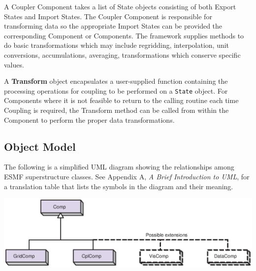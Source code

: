 A Coupler Component takes a list of State objects consisting of
both Export States and Import States.
The Coupler Component is responsible for transforming data 
so the appropriate Import States can be provided the corresponding
Component or Components.
The framework supplies
methods to do basic transformations which may include regridding,
interpolation, unit conversions, accumulations, averaging,
transformations which conserve specific values.


A {\bf Transform} object encapsulates a user-supplied function
containing the processing operations for coupling to be 
performed on a {\tt State} object.  For Components where it is not
feasible to return to the calling routine each time Coupling is
required, the Transform method can be called from within the
Component to perform the proper data transformations.

\newpage
\subsection{Object Model}

The following is a simplified UML diagram showing the relationships among
ESMF superstructure classes.  See Appendix A, {\it A Brief 
Introduction to UML},
for a translation table that lists the symbols in the diagram and their 
meaning.

\begin{center}
\includegraphics{Comp_obj.eps}   
\end{center}

